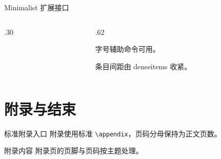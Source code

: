 \begin{frame}{Minimalist 扩展接口}
  \begin{columns}[T,onlytextwidth]
    \begin{column}{.30\textwidth}
    \end{column}
    \begin{column}{.62\textwidth}
      \begin{denseitems}
        \item 字号辅助命令可用。
        \item 条目间距由 denseitems 收紧。
      \end{denseitems}
    \end{column}
  \end{columns}
\end{frame}


\section{附录与结束}

\begin{frame}{标准附录入口}
  附录使用标准 \texttt{\textbackslash appendix}，页码分母保持为正文页数。
\end{frame}

\appendix

\begin{frame}{附录内容}
  附录页的页脚与页码按主题处理。
\end{frame}



